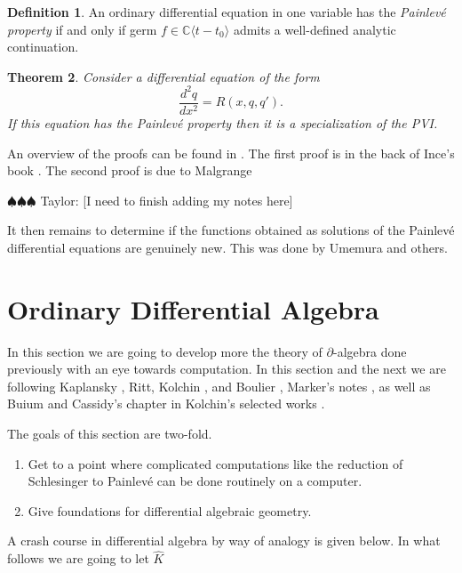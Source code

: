 \documentclass[12pt]{book}
\newcommand{\taylor}[1]{{\color{blue} \sf $\spadesuit\spadesuit\spadesuit$ Taylor: [#1]}}
\numberwithin{equation}{section}
\newtheorem{theorem}{Theorem}[subsection]
\theoremstyle{definition}
\newtheorem{definition}[theorem]{Definition}
\theoremstyle{remark}
\newcommand{\CC}{\mathbb{C}}
\newcommand{\Khat}{\widehat{K}}
\begin{document}
\begin{definition}
	An ordinary differential equation in one variable has the \emph{Painlev\'e property} if and only if germ $f\in\CC\langle t-t_0\rangle$ admits a well-defined analytic continuation.
\end{definition}

\begin{theorem}
	Consider a differential equation of the form 
	$$ \dfrac{d^2q}{dx^2} = R(x,q,q'). $$
	If this equation has the Painlev\'{e} property then it is a specialization of the PVI.
\end{theorem}

An overview of the proofs can be found in \cite{Shimomura2003}.
The first proof is in the back of Ince's book \cite{Ince1944}. 
The second proof is due to Malgrange 

\taylor{I need to finish adding my notes here}


It then remains to determine if the functions obtained as solutions of the Painlev\'e differential equations are genuinely new. 
This was done by Umemura and others. 


\chapter{Ordinary Differential Algebra}

In this section we are going to develop more the theory of $\partial$-algebra done previously with an eye towards computation. 
In this section and the next we are following Kaplansky \cite{Kaplansky1976}, Ritt\cite{Ritt1950}, Kolchin \cite{Kolchin1973}, and Boulier \cite[\href{https://hal.archives-ouvertes.fr/hal-02378197v2/document}{online version}]{Boulier2019}, Marker's notes \cite{Marker2000}, as well as Buium and Cassidy's chapter in Kolchin's selected works \cite{Kolchin1999}.

The goals of this section are two-fold. 
\begin{enumerate}
	\item Get to a point where complicated computations like the reduction of Schlesinger to Painlev\'e can be done routinely on a computer. 
	\item Give foundations for differential algebraic geometry.
\end{enumerate}

A crash course in differential algebra by way of analogy is given below. 
In what follows we are going to let $\Khat$
\end{document}
